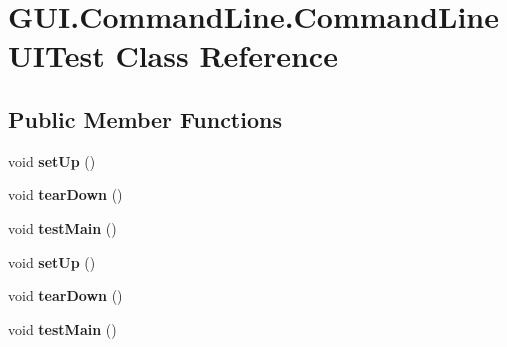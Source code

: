 \hypertarget{class_g_u_i_1_1_command_line_1_1_command_line_u_i_test}{\section{G\-U\-I.\-Command\-Line.\-Command\-Line\-U\-I\-Test Class Reference}
\label{class_g_u_i_1_1_command_line_1_1_command_line_u_i_test}
}
\subsection*{Public Member Functions}
\begin{DoxyCompactItemize}
\item 
\hypertarget{class_g_u_i_1_1_command_line_1_1_command_line_u_i_test_a7cc82905ccd1905146a12792b7d3d3f8}{void {\bfseries set\-Up} ()}\label{class_g_u_i_1_1_command_line_1_1_command_line_u_i_test_a7cc82905ccd1905146a12792b7d3d3f8}

\item 
\hypertarget{class_g_u_i_1_1_command_line_1_1_command_line_u_i_test_a707ecf5389a52b39e0b42fee20cbb4ea}{void {\bfseries tear\-Down} ()}\label{class_g_u_i_1_1_command_line_1_1_command_line_u_i_test_a707ecf5389a52b39e0b42fee20cbb4ea}

\item 
\hypertarget{class_g_u_i_1_1_command_line_1_1_command_line_u_i_test_adbc3ad3aecf48a764de4c24b3d00c985}{void {\bfseries test\-Main} ()}\label{class_g_u_i_1_1_command_line_1_1_command_line_u_i_test_adbc3ad3aecf48a764de4c24b3d00c985}

\item 
\hypertarget{class_g_u_i_1_1_command_line_1_1_command_line_u_i_test_a7cc82905ccd1905146a12792b7d3d3f8}{void {\bfseries set\-Up} ()}\label{class_g_u_i_1_1_command_line_1_1_command_line_u_i_test_a7cc82905ccd1905146a12792b7d3d3f8}

\item 
\hypertarget{class_g_u_i_1_1_command_line_1_1_command_line_u_i_test_a707ecf5389a52b39e0b42fee20cbb4ea}{void {\bfseries tear\-Down} ()}\label{class_g_u_i_1_1_command_line_1_1_command_line_u_i_test_a707ecf5389a52b39e0b42fee20cbb4ea}

\item 
\hypertarget{class_g_u_i_1_1_command_line_1_1_command_line_u_i_test_adbc3ad3aecf48a764de4c24b3d00c985}{void {\bfseries test\-Main} ()}\label{class_g_u_i_1_1_command_line_1_1_command_line_u_i_test_adbc3ad3aecf48a764de4c24b3d00c985}

\end{DoxyCompactItemize}
